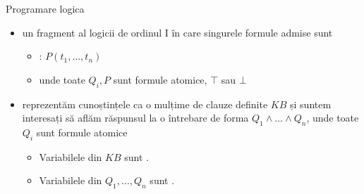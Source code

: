 \documentclass[xcolor=pdftex,romanian,colorlinks]{beamer}
\begin{document}
\begin{frame}{Programare logica}

\begin{itemize}
\item {} un fragment al logicii de ordinul I în care singurele formule admise sunt 
	\begin{itemize}
		\item {}: $P(t_1,\ldots,t_n)$
		\item {} 
		
		unde toate $Q_i,P$ sunt formule atomice, $\top$ sau $\bot$
	
	\end{itemize}
	\medskip
	

	 
	\item {}   reprezentăm cunoștințele ca o mulțime de clauze definite $KB$ și suntem interesați să aflăm răspunsul la o întrebare de forma $Q_1\wedge\ldots \wedge Q_n$, unde toate $Q_i$ sunt formule atomice

	\begin{center}
	\end{center}
	
\begin{itemize}	
	\item Variabilele din $KB$  sunt  .

	\medskip
	\item Variabilele din $Q_1, \ldots,  Q_n$ sunt .
	\end{itemize}
\end{itemize}

\end{frame}
\end{document}
